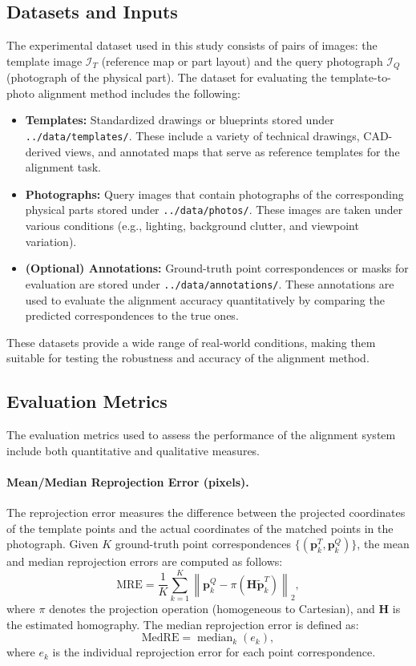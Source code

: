 \subsection{Datasets and Inputs}
The experimental dataset used in this study consists of pairs of images: the template image $\mathcal{I}_T$ (reference map or part layout) and the query photograph $\mathcal{I}_Q$ (photograph of the physical part). The dataset for evaluating the template-to-photo alignment method includes the following:
\begin{itemize}
  \item \textbf{Templates:} Standardized drawings or blueprints stored under \texttt{../data/templates/}. These include a variety of technical drawings, CAD-derived views, and annotated maps that serve as reference templates for the alignment task.
  \item \textbf{Photographs:} Query images that contain photographs of the corresponding physical parts stored under \texttt{../data/photos/}. These images are taken under various conditions (e.g., lighting, background clutter, and viewpoint variation).
  \item \textbf{(Optional) Annotations:} Ground-truth point correspondences or masks for evaluation are stored under \texttt{../data/annotations/}. These annotations are used to evaluate the alignment accuracy quantitatively by comparing the predicted correspondences to the true ones.
\end{itemize}

These datasets provide a wide range of real-world conditions, making them suitable for testing the robustness and accuracy of the alignment method.

\subsection{Evaluation Metrics}
The evaluation metrics used to assess the performance of the alignment system include both quantitative and qualitative measures.

\paragraph{Mean/Median Reprojection Error (pixels).}
The reprojection error measures the difference between the projected coordinates of the template points and the actual coordinates of the matched points in the photograph. Given $K$ ground-truth point correspondences $\{(\mathbf{p}_k^T,\mathbf{p}_k^Q)\}$, the mean and median reprojection errors are computed as follows:
\[
\text{MRE} = \frac{1}{K}\sum_{k=1}^{K}\left\|\mathbf{p}_k^Q - \pi(\mathbf{H}\tilde{\mathbf{p}}_k^T)\right\|_2,
\]
where $\pi$ denotes the projection operation (homogeneous to Cartesian), and $\mathbf{H}$ is the estimated homography. The median reprojection error is defined as:
\[
\text{MedRE} = \operatorname{median}_{k}(e_k),
\]
where $e_k$ is the individual reprojection error for each point correspondence.

